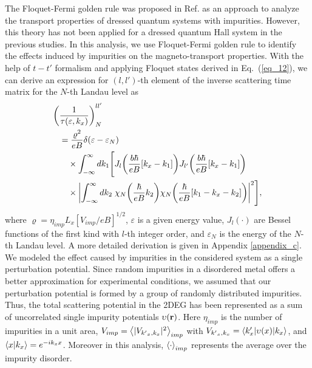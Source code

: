 
The Floquet-Fermi golden rule was proposed in Ref. \cite{wackerl20} as an approach to analyze the transport properties of dressed quantum systems with impurities.
However, this theory has not been applied for a dressed quantum Hall system in the previous studies. In this analysis, we use Floquet-Fermi golden rule to identify the effects induced by impurities on the magneto-transport properties.
With the help of $t-t'$ formalism \cite{wackerl20,grifoni98,sambe75,peskin93,althorpe97} and applying Floquet states derived in Eq.~(\ref{eq_12}), we can derive an  expression for $(l,l')$-th element of the inverse scattering time matrix for the $N$-th Landau level as
\begin{equation} \label{eq_13}
  \begin{aligned}
    \bigg(&\frac{1}{\tau(\varepsilon,k_x)}\bigg)^{ll'}_{N} \\
    & =
    \frac { \varrho^2}{eB}
    \delta(\varepsilon - \varepsilon_{N}) \\
    & \quad\times
    \int_{-\infty}^{\infty} d k_1 \Bigg[
    J_l\qty(\frac{b\hbar}{eB}[{k}_x - k_1])
    J_{l'}\qty(\frac{b\hbar}{eB}[{k}_x - k_1]) \\
    & \quad\times
    \qty|
    \int_{-\infty}^{\infty} dk_2 \;
    {\chi}_{N}\qty(\frac{\hbar}{eB}k_2)
    {\chi}_{N}\qty(\frac{\hbar}{eB} \qty[k_1 - {k}_x - k_2])|^2\Bigg],
  \end{aligned}
\end{equation}
where $\varrho = \eta_{imp} L_x [ { V_{imp}}/{eB}]^{1/2}$, $\varepsilon$ is a given energy value, $J_l(\cdot)$ are Bessel functions of the first kind with $l$-th integer order, and $\varepsilon_N$ is the energy of the $N$-th Landau level.
A more detailed derivation is given in Appendix \ref{appendix_c}.
We modeled the effect caused by impurities in the considered system as a single perturbation potential.
Since random impurities in a disordered metal offers a better approximation for experimental conditions, we assumed that our perturbation potential is formed by a group of randomly distributed impurities.
Thus, the total scattering potential in the 2DEG has been represented as a sum of uncorrelated single impurity potentials $\upsilon(\vb{r})$. Here $\eta_{imp}$ is the number of impurities in a unit area, $V_{imp} = \expval{|V_{{k'}_x,k_x}|^2}_{imp}$ with $V_{{k'}_x,k_x} = \mel**{k'_x}{\upsilon(x) }{k_x}$, and $\braket{x}{k_x} = e^{-ik_x x}$.
Moreover in this analysis, $\expval{\cdot}_{imp}$ represents the average over the impurity disorder.

